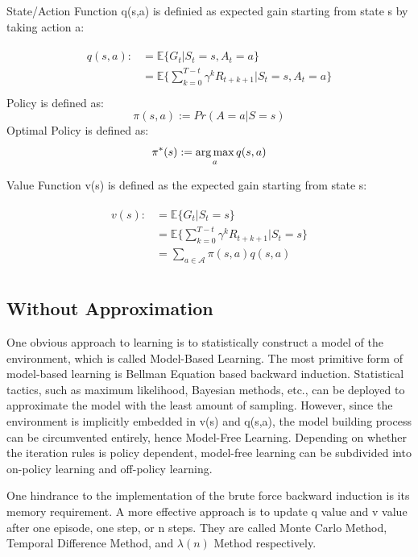 State/Action Function q(s,a) is definied as expected gain starting from state s by taking action a:

\begin{align}
\begin{split}
    q(s,a) :&= \mathbb{E}\{G_t|S_t=s,A_t=a\}\\
    &=\mathbb{E} \{\sum_{k=0}^{T-t} \gamma ^k R_{t+k+1}| S_t=s,A_t=a\}\\
\end{split}
\end{align}
Policy is defined as:
\begin{equation}
    \pi(s,a):=Pr(A=a|S=s)
\end{equation}
Optimal Policy is defined as:
\begin{equation}
    \pi^*(s):=\operatorname*{arg\,max}_a q(s,a)
\end{equation}


Value Function v(s) is defined as the expected gain starting from state s:

\begin{align}
\begin{split}
    v(s) :&=  \mathbb{E}\{G_t|S_t=s\}\\
    &=\mathbb{E} \{\sum_{k=0}^{T-t} \gamma ^k R_{t+k+1}| S_t=s\}\\
    &=\sum_{a \in \mathcal{A}} \pi(s,a) q(s,a)\\
\end{split}
\end{align}

\subsection{Without Approximation}
One obvious approach to learning is to statistically construct a model of the environment, which is called Model-Based Learning. The most primitive form of model-based learning is Bellman Equation based backward induction. Statistical tactics, such as maximum likelihood, Bayesian methods, etc., can be deployed to approximate the model with the least amount of sampling. However, since the environment is implicitly embedded in v(s) and q(s,a), the model building process can be circumvented entirely, hence Model-Free Learning. Depending on whether the iteration rules is policy dependent, model-free learning can be subdivided into on-policy learning and off-policy learning.

One hindrance to the implementation of the brute force backward induction is its memory requirement. A more effective approach is to update q value and v value after one episode, one step, or n steps. They are called Monte Carlo Method, Temporal Difference Method, and $\lambda(n)$ Method respectively.

